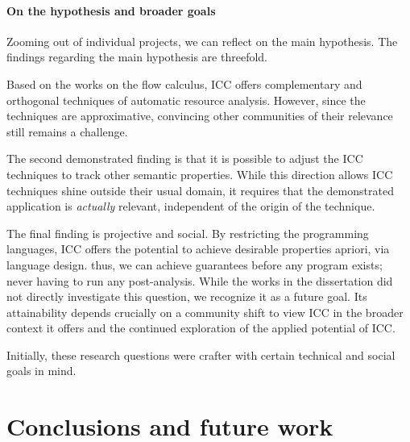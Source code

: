 \paragraph{On the hypothesis and broader goals}
Zooming out of individual projects, we can reflect on the main hypothesis.
The findings regarding the main hypothesis are threefold.
\begin{enumerate*}
\item Based on the works on the flow calculus, ICC offers complementary and orthogonal techniques of automatic resource analysis.
However, since the techniques are approximative, convincing other communities of their relevance still remains a challenge.

\item The second demonstrated finding is that it is possible to adjust the ICC techniques to track other semantic properties.
While this direction allows ICC techniques shine outside their usual domain, it requires that the demonstrated application is \emph{actually} relevant, independent of the origin of the technique.

\item The final finding is projective and social.
By restricting the programming languages, ICC offers the potential to achieve desirable properties apriori, via language design.
thus, we can achieve guarantees before any program exists;
never having to run any post-analysis.
While the works in the dissertation did not directly investigate this question, we recognize it as a future goal.
Its attainability depends crucially on a community shift to view ICC in the broader context it offers and the continued exploration of the applied potential of ICC.
\end{enumerate*}

Initially, these research questions were crafter with certain technical and social goals in mind.

\section{Conclusions and future work}
